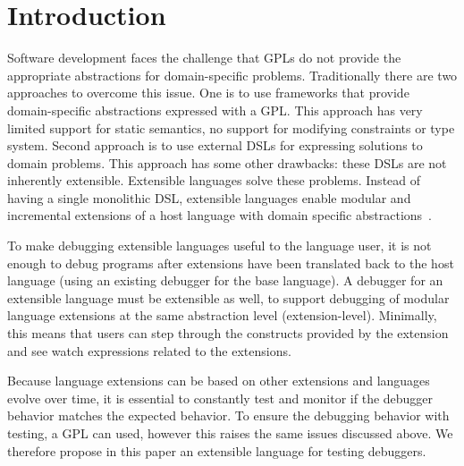 \section{Introduction}

Software development faces the challenge that \acp{GPL}
do not provide the appropriate abstractions for domain-specific problems. 
Traditionally there are two  
approaches to overcome this issue. One is to use frameworks 
that provide domain-specific abstractions expressed with a \ac{GPL}.
This approach has very limited support for static semantics, \eg 
no support for modifying constraints or type system.
Second approach is to use external \acp{DSL} for 
expressing solutions to domain problems. This approach 
has some other drawbacks: 
these \acp{DSL} are not inherently extensible.
Extensible languages solve these problems. Instead of having a single 
monolithic \ac{DSL}, extensible languages enable modular and 
incremental extensions of a host language with domain specific 
abstractions~\cite{Voelter2011}.

To make debugging extensible languages useful to the language user, it is not
enough to debug programs after extensions have been translated back to the host 
language (using an existing debugger for the base language).  
A debugger for an extensible language must be extensible as well, to support
debugging of modular language extensions at the same abstraction level
(extension-level).
Minimally, this means that users can step through the constructs 
provided by the extension and see watch expressions related to the extensions.

Because language extensions can be based on other extensions and languages
evolve over time, it is essential to constantly test and monitor if the debugger
behavior matches the expected behavior. To ensure the debugging behavior with
testing, a \ac{GPL} can used, however this raises the same issues
discussed above. 
We therefore propose in this paper an extensible
language for testing debuggers. 
